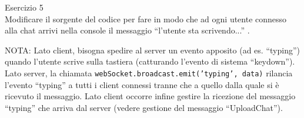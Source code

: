 \documentclass[11pt]{article}
\begin{document}
\begin{tcolorbox}[colback=blue!5!white,colframe=blue!75!black,title=\textbf{DOMANDA}, breakable]
Esercizio 5\\
Modificare il sorgente del codice per fare in modo che ad ogni utente connesso alla chat arrivi nella console il messaggio ``l'utente sta scrivendo...'' .

NOTA: Lato client, bisogna spedire al server un evento apposito (ad es. ``typing'') quando l'utente scrive sulla tastiera (catturando l'evento di sistema ``keydown''). Lato server, la chiamata \texttt{webSocket.broadcast.emit('typing', data)} rilancia l'evento ``typing'' a tutti i client connessi tranne che a quello dalla quale si è ricevuto il messaggio. Lato client occorre infine gestire la ricezione del messaggio ``typing'' che arriva dal server (vedere gestione del messaggio ``UploadChat'').
\end{tcolorbox}
\end{document}
